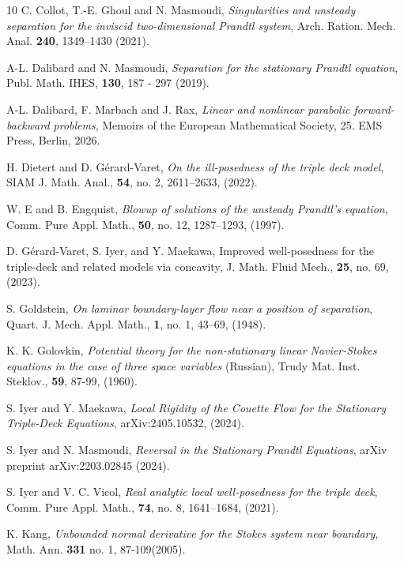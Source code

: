 \documentclass{amsart}
\numberwithin{equation}{section}
\begin{document}
\begin{thebibliography}{10}
 C. Collot, T.-E. Ghoul  and N. Masmoudi, {\it Singularities and unsteady separation for the inviscid two-dimensional Prandtl system}, Arch. Ration. Mech. Anal. {\bf 240}, 1349–1430 (2021).



 A-L. Dalibard  and N. Masmoudi, {\it Separation for the stationary Prandtl equation}, Publ. Math. IHES, {\bf 130}, 187 - 297 (2019).

 A-L. Dalibard, F. Marbach  and J. Rax, {\it Linear and nonlinear parabolic forward-backward problems}, Memoirs of the European Mathematical Society, 25. EMS Press, Berlin, 2026.

 H. Dietert and D. G\'{e}rard-Varet, {\it On the ill-posedness of the triple deck model}, SIAM J. Math. Anal., {\bf 54}, no. 2, 2611–2633, (2022).

 W. E and B. Engquist, {\it Blowup of solutions of the unsteady Prandtl’s equation}, Comm. Pure Appl. Math., {\bf 50}, no. 12, 1287–1293, (1997).

 D. G\'{e}rard-Varet, S. Iyer, and Y. Maekawa, Improved well-posedness for the triple-deck and related models via concavity, J. Math. Fluid Mech., {\bf 25}, no. 69, (2023).

 S. Goldstein, {\it On laminar boundary-layer flow near a position of separation}, Quart. J. Mech. Appl. Math., {\bf 1}, no. 1, 43–69, (1948).

 K. K. Golovkin, {\it Potential theory for the non-stationary linear Navier-Stokes equations in the case of three space variables} (Russian), Trudy Mat. Inst. Steklov., {\bf 59}, 87-99, (1960).

 S. Iyer  and Y. Maekawa, {\it Local Rigidity of the Couette Flow for the Stationary Triple-Deck Equations}, arXiv:2405.10532, (2024).

 S. Iyer  and N. Masmoudi, {\it Reversal in the Stationary Prandtl Equations}, arXiv preprint arXiv:2203.02845 (2024).

 S. Iyer and V. C. Vicol, {\it Real analytic local well-posedness for the triple deck}, Comm. Pure Appl. Math., {\bf 74}, no. 8, 1641–1684, (2021).

 K. Kang, {\it Unbounded normal derivative for the Stokes system
near boundary}, Math. Ann.  {\bf 331} no. 1, 87-109(2005).


\end{thebibliography}
\end{document}
